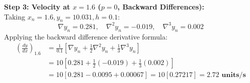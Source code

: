 \medskip
\noindent\textbf{Step 3: Velocity at $x = 1.6$ ($p = 0$, Backward Differences):} \\
Taking $x_n = 1.6, y_n = 10.031, h = 0.1$:
\begin{equation}
    \nabla y_n = 0.281, \quad \nabla^2 y_n = -0.019, \quad \nabla^3 y_n = 0.002
\end{equation}
Applying the backward difference derivative formula:
\begin{align}
    \left(\frac{dy}{dx}\right)_{1.6} &= \frac{1}{0.1}\left[ \nabla y_n + \frac{1}{2}\nabla^2 y_n + \frac{1}{3}\nabla^3 y_n \right] \nonumber \\
    &= 10 \left[ 0.281 + \frac{1}{2}(-0.019) + \frac{1}{3}(0.002) \right] \nonumber \\
    &= 10 [0.281 - 0.0095 + 0.00067] = 10[0.27217] = \mathbf{2.72 \text{ units/s}}
\end{align}
